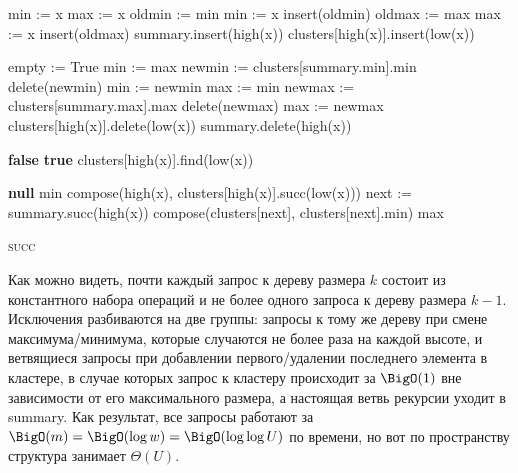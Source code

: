 \begin{algorithmic}[1]
			\State min := x
			\State max := x
			\State oldmin := min
			\State min := x
			\State insert(oldmin)
			\State oldmax := max
			\State max := x
			\State insert(oldmax)
				\State summary.insert(high(x))
			\EndIf
			\State clusters[high(x)].insert(low(x))
		\EndIf
	\EndProcedure

			\State \Return
		\EndIf
				\State empty := True
				\State min := max
			\Else
				\State newmin := clusters[summary.min].min
				\State delete(newmin)
				\State min := newmin
			\EndIf
				\State max := min
			\Else
				\State newmax := clusters[summary.max].max
				\State delete(newmax)
				\State max := newmax
			\EndIf
		\Else
			\State clusters[high(x)].delete(low(x))
				\State summary.delete(high(x))
			\EndIf
		\EndIf
	\EndProcedure

			\State \Return \textbf{false}
		\EndIf
			\State \Return \textbf{true}
		\EndIf
		\State \Return clusters[high(x)].find(low(x))
	\EndProcedure

			\State \Return \textbf{null}
		\EndIf
			\State \Return min
		\EndIf
			\State \Return compose(high(x), clusters[high(x)].succ(low(x)))
		\EndIf
			\State next := summary.succ(high(x))
			\State \Return compose(clusters[next], clusters[next].min)
		\EndIf
		\State \Return max
	\EndProcedure

		\State {} \textsc{succ}
	\EndProcedure
\end{algorithmic}

Как можно видеть, почти каждый запрос к дереву размера $k$ состоит из константного набора операций и не более одного запроса к дереву размера $k-1$. Исключения разбиваются на две группы: запросы к тому же дереву при смене максимума/минимума, которые случаются не более раза на каждой высоте, и ветвящиеся запросы при добавлении первого/удалении последнего элемента в кластере, в случае которых запрос к кластеру происходит за $\BigO(1)$ вне зависимости от его максимального размера, а настоящая ветвь рекурсии уходит в summary. Как результат, все запросы работают за $\BigO(m) = \BigO(\log w) = \BigO(\log \log U)$ по времени, но вот по пространству структура занимает $\Theta(U)$.

